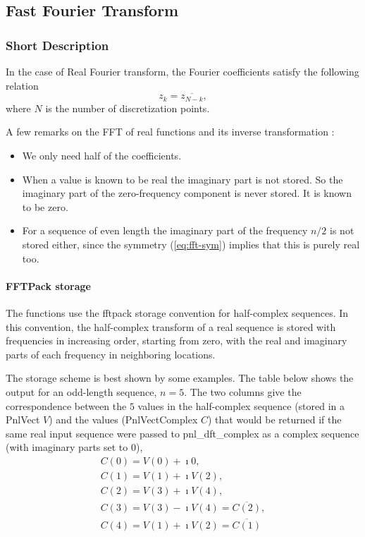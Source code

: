 \subsection{Fast Fourier Transform}
\subsubsection{Short Description}

In the case of Real Fourier transform, the Fourier coefficients satisfy the
following relation
\begin{equation}
  \label{eq:fft-sym}
  z_k = \overline{z_{N-k}}, 
\end{equation}
where $N$ is the number of discretization points.

A few remarks on the FFT of real functions and its inverse transformation :
\begin{itemize}
\item We only need half of the coefficients.
\item When a value is known to be real the imaginary part is not stored.
So the imaginary part of the zero-frequency component is never stored. It is
known to be zero.
\item For a sequence of even length the imaginary part of the frequency
  $n/2$ is not stored either, since the symmetry (\ref{eq:fft-sym}) implies
  that this is purely real too.
\end{itemize}


\paragraph{FFTPack storage}
\label{sec:fftpack-storage}

The functions use the fftpack storage convention for half-complex sequences.
In this convention, the half-complex transform of a real sequence is stored
with frequencies in increasing order, starting from zero, with the real and
imaginary parts of each frequency in neighboring locations.

The storage scheme is best shown by some examples. The table below shows the
output for an odd-length sequence, $n=5$.  The two columns give the
correspondence between the $5$ values in the half-complex sequence (stored in
a PnlVect $V$) and the values (PnlVectComplex $C$) that would be returned if
the same real input sequence were passed to pnl_dft_complex as a complex
sequence (with imaginary parts set to 0), 
\begin{equation}
  \begin{array}{l}
         C(0) =  V(0) + \imath 0, \\ 
         C(1) =  V(1) + \imath V(2), \\
         C(2) =  V(3) + \imath V(4), \\
         C(3) = V(3) - \imath V(4)=  \overline{C(2)} , \\
         C(4) = V(1) + \imath V(2)=  \overline{C(1)} 
  \end{array}   
\end{equation}

